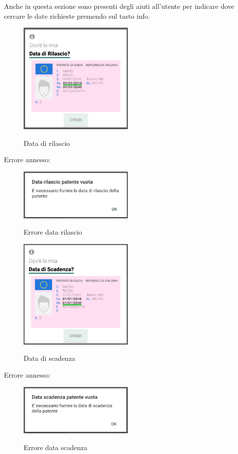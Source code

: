 \begin{itemize}
Anche in questa sezione sono presenti degli aiuti all'utente per indicare dove cercare le date richieste premendo sul tasto info.
\begin{figure}[H] 
	\centering 
	\includegraphics[width=0.5\textwidth]{res/images/patente2_1.png}\\
	\caption{Data di rilascio}
	\label{patente5}
\end{figure}
Errore annesso:
 \begin{figure}[H] 
	\centering 
	\includegraphics[width=0.5\textwidth]{res/images/patente2errore_rilascio.png}\\
	\caption{Errore data rilascio}
	\label{patenteerror1}
\end{figure}
\begin{figure}[H] 
	\centering 
	\includegraphics[width=0.5\textwidth]{res/images/patente2_2.png}\\
	\caption{Data di scadenza}
	\label{patente6}
\end{figure}
Errore annesso:
\begin{figure}[H] 
	\centering
	\includegraphics[width=0.5\textwidth]{res/images/patente2errore_scadenza.png}\\
	\caption{Errore data scadenza}
	\label{patenteerror2}
\end{figure}
\pagebreak


\end{itemize}
